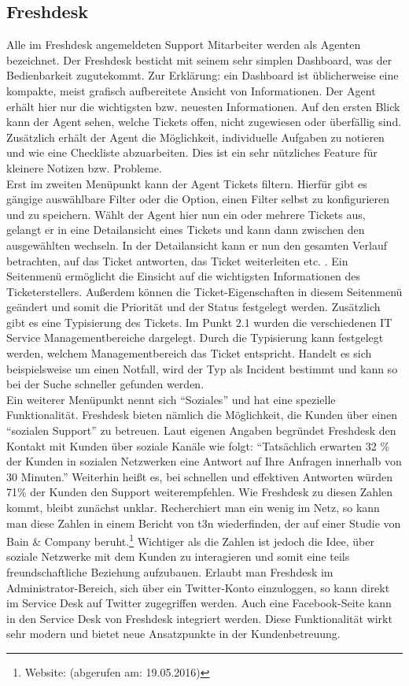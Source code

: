 \subsection{Freshdesk}
\noindent
Alle im Freshdesk angemeldeten Support Mitarbeiter werden als Agenten bezeichnet.
Der Freshdesk besticht mit seinem sehr simplen Dashboard, was der Bedienbarkeit zugutekommt. Zur Erklärung: ein Dashboard ist üblicherweise eine kompakte, meist grafisch aufbereitete Ansicht von Informationen. Der Agent erhält hier nur die wichtigsten bzw. neuesten Informationen. Auf den ersten Blick kann der Agent sehen, welche Tickets offen, nicht zugewiesen oder überfällig sind. Zusätzlich erhält der Agent die Möglichkeit, individuelle Aufgaben zu notieren und wie eine Checkliste abzuarbeiten. Dies ist ein sehr nützliches Feature für kleinere Notizen bzw. Probleme.\\ 
Erst im zweiten Menüpunkt kann der Agent Tickets filtern. Hierfür gibt es gängige auswählbare Filter oder die Option, einen Filter selbst zu konfigurieren und zu speichern. Wählt der Agent hier nun ein oder mehrere Tickets aus, gelangt er in eine Detailansicht eines Tickets und kann dann zwischen den ausgewählten wechseln. In der Detailansicht kann er nun den gesamten Verlauf betrachten, auf das Ticket antworten, das Ticket weiterleiten etc. . Ein Seitenmenü ermöglicht die Einsicht auf die wichtigsten Informationen des Ticketerstellers. Außerdem können die Ticket-Eigenschaften in diesem Seitenmenü geändert und somit die Priorität und der Status festgelegt werden. Zusätzlich gibt es eine Typisierung des Tickets. Im Punkt 2.1 wurden die verschiedenen IT Service Managementbereiche dargelegt. Durch die Typisierung kann festgelegt werden, welchem Managementbereich das Ticket entspricht. Handelt es sich beispielsweise um einen Notfall, wird der Typ als Incident bestimmt und kann so bei der Suche schneller gefunden werden.\\
Ein weiterer Menüpunkt nennt sich \enquote{Soziales} und hat eine spezielle Funktionalität. Freshdesk bieten nämlich die Möglichkeit, die Kunden über einen \enquote{sozialen Support} zu betreuen. Laut eigenen Angaben begründet Freshdesk den Kontakt mit Kunden über soziale Kanäle wie folgt: \enquote{Tatsächlich erwarten 32 \% der Kunden in sozialen Netzwerken eine Antwort auf Ihre Anfragen innerhalb von 30 Minuten.} Weiterhin heißt es, bei schnellen und effektiven Antworten würden 71\% der Kunden den Support weiterempfehlen. Wie Freshdesk zu diesen Zahlen kommt, bleibt zunächst unklar. Recherchiert man ein wenig im Netz, so kann man diese Zahlen in einem Bericht von t3n wiederfinden, der auf einer Studie von  Bain \& Company beruht.\footnote{Website: \citeauthor{Rixecker} (abgerufen am: 19.05.2016)} Wichtiger als die Zahlen ist jedoch die Idee, über soziale Netzwerke mit dem Kunden zu interagieren und somit eine teils freundschaftliche Beziehung aufzubauen. Erlaubt man Freshdesk im Administrator-Bereich, sich über ein Twitter-Konto einzuloggen, so kann direkt im Service Desk auf Twitter zugegriffen werden. Auch eine Facebook-Seite kann in den Service Desk von Freshdesk integriert werden. Diese Funktionalität wirkt sehr modern und bietet neue Ansatzpunkte in der Kundenbetreuung.\\
